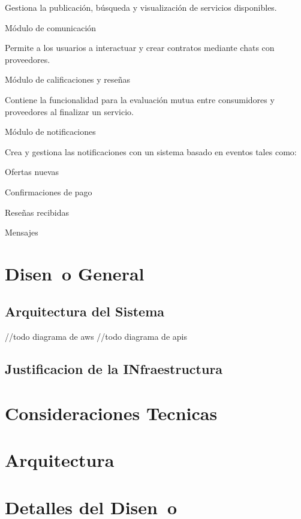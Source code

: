 \documentclass{article}
\begin{document}
      Gestiona la publicación, búsqueda y visualización de servicios disponibles. 

      Módulo de comunicación  

      Permite a los usuarios a interactuar y crear contratos mediante chats con proveedores. 

      Módulo de calificaciones y reseñas   

      Contiene la funcionalidad para la evaluación mutua entre consumidores y proveedores al finalizar un servicio.  

      Módulo de notificaciones  

      Crea y gestiona las notificaciones con un sistema basado en eventos tales como: 

      Ofertas nuevas 

      Confirmaciones de pago 

      Reseñas recibidas  

      Mensajes 
      
\section{Disen~o General}
  
  \subsection{Arquitectura del Sistema}
  //todo diagrama de aws
  //todo diagrama de apis
  \subsection{Justificacion de la INfraestructura}

\section{Consideraciones Tecnicas}

\section{Arquitectura}

\section{Detalles del Disen~o}
\end{document}
